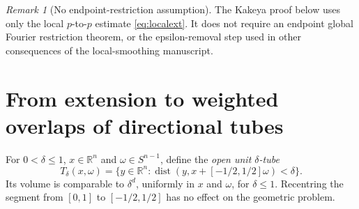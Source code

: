 \documentclass[11pt,a4paper]{article}
\numberwithin{equation}{section}
\theoremstyle{definition}
\theoremstyle{remark}
\newtheorem{remark}[theorem]{Remark}
\newcommand{\R}{\mathbb R}
\newcommand{\Sph}{S^{n-1}}
\begin{document}
\begin{remark}[No endpoint-restriction assumption]
The Kakeya proof below uses only the local $p$-to-$p$ estimate
\eqref{eq:localext}. It does not require an endpoint global
Fourier restriction theorem, or the epsilon-removal step used in
other consequences of the local-smoothing manuscript.
\end{remark}

\section{From extension to weighted overlaps of directional tubes}
\label{sec:tubes}
For $0<\delta\le1$, $x\in\R^n$ and $\omega\in\Sph$, define the
\emph{open unit $\delta$-tube}
\begin{equation}\label{eq:tube}
 T_{\delta}(x,\omega)=\{y\in\R^n:
            \operatorname{dist}(y,x+[-1/2,1/2]\omega)<\delta\}.
\end{equation}
Its volume is comparable to $\delta^d$, uniformly in $x$ and
$\omega$, for $\delta\le1$. Recentring the segment from $[0,1]$
to $[-1/2,1/2]$ has no effect on the geometric problem.
\end{document}

